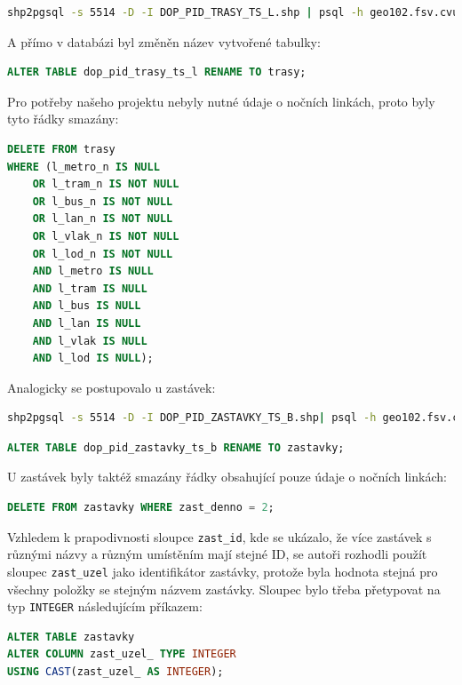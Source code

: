 \documentclass[a4paper, 12pt]{article}
\begin{document}
\begin{lstlisting}[language=bash]
shp2pgsql -s 5514 -D -I DOP_PID_TRASY_TS_L.shp | psql -h geo102.fsv.cvut.cz -d pgis_uzpd -U uzpd18_a
\end{lstlisting} 
 
A přímo v databázi byl změněn název vytvořené tabulky:

\begin{lstlisting}[language=sql]
ALTER TABLE dop_pid_trasy_ts_l RENAME TO trasy;
\end{lstlisting} 

Pro potřeby našeho projektu nebyly nutné údaje o nočních linkách, proto byly tyto řádky smazány: 
\begin{lstlisting}[language=sql]
DELETE FROM trasy 
WHERE (l_metro_n IS NULL
	OR l_tram_n IS NOT NULL
	OR l_bus_n IS NOT NULL
	OR l_lan_n IS NOT NULL
	OR l_vlak_n IS NOT NULL
	OR l_lod_n IS NOT NULL
	AND l_metro IS NULL
	AND l_tram IS NULL
	AND l_bus IS NULL
	AND l_lan IS NULL 
	AND l_vlak IS NULL 
	AND l_lod IS NULL);
\end{lstlisting} 

Analogicky se postupovalo u zastávek:

\begin{lstlisting}[language=bash]
shp2pgsql -s 5514 -D -I DOP_PID_ZASTAVKY_TS_B.shp| psql -h geo102.fsv.cvut.cz -d pgis_uzpd -U uzpd18_a
\end{lstlisting} 

\begin{lstlisting}[language=sql]
ALTER TABLE dop_pid_zastavky_ts_b RENAME TO zastavky;
\end{lstlisting} 

U zastávek byly taktéž smazány řádky obsahující pouze údaje o nočních linkách:
\begin{lstlisting}[language=sql]
DELETE FROM zastavky WHERE zast_denno = 2;
\end{lstlisting} 

Vzhledem k prapodivnosti sloupce \texttt{zast\_id}, kde se ukázalo, že více zastávek s různými názvy a různým umístěním mají stejné ID, se autoři rozhodli použít sloupec \texttt{zast\_uzel} jako identifikátor zastávky, protože byla hodnota stejná pro všechny položky se stejným názvem zastávky. Sloupec bylo třeba přetypovat na typ \texttt{INTEGER} následujícím příkazem: 

\begin{lstlisting}[language=sql]
ALTER TABLE zastavky 
ALTER COLUMN zast_uzel_ TYPE INTEGER 
USING CAST(zast_uzel_ AS INTEGER);
\end{lstlisting} 
\end{document}
